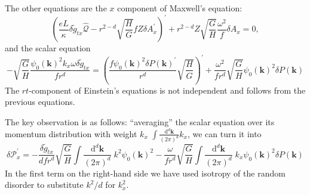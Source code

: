\documentclass[10pt, oneside]{book}
\begin{document}
\begin{doublespace}
The other equations are the $x$ component of
Maxwell's equation: 
\begin{equation}
\left(\frac{eL}{\kappa} \delta \tilde{g}_{tx} \hat{\mathcal{Q}} - r^{2-d}\sqrt{\frac{H}{G}}fZ\delta A_x^\prime \right)^\prime + r^{2-d}Z\sqrt{\frac{G}{H}} \frac{\omega^2}{f} \delta A_x= 0, \label{eq:7}
\end{equation}
and the scalar equation 
\begin{equation}
-\sqrt{\frac{G}{H}}\frac{\psi_0(\mathbf{k})^2 k_x \omega \delta \tilde{g}_{tx}}{fr^d}
= \left(\frac{f\psi_0(\mathbf{k})^2 \delta P(\mathbf{k})^\prime}{r^d}\sqrt{\frac{H}{G}}\right)^\prime+ \frac{\omega^2}{f r^d}\sqrt{\frac{G}{H}} \psi_0(\mathbf{k})^2 \delta P(\mathbf{k})    \label{scalareq2}
\end{equation}
The $rt$-component of Einstein's equations is not independent and follows from the previous equations.

The key observation is as follows: ``averaging'' the scalar equation over its momentum distribution with weight $k_x$ $\int \frac{\mathrm{d}^d \mathbf{k} }{(2\pi)^d} k_x$, we can turn it into 
\begin{equation}
\delta \mathcal{P}_x^\prime = -\frac{ \delta\tilde{g}_{tx}}{dfr^d} \sqrt{\frac{G}{H}} \int \frac{\mathrm{d}^d\mathbf{k}}{(2\pi)^d} \; k^2\psi_0(\mathbf{k})^2  - \frac{\omega}{ f r^d}\sqrt{\frac{G}{H}}\int \frac{\mathrm{d}^d\mathbf{k}}{(2\pi)^d}\; k_x \psi_0(\mathbf{k})^2 \delta P(\mathbf{k})\label{eq:9}
\end{equation}
In the first term on the right-hand side we have used isotropy of the random disorder to substitute $k^2/d$ for $k_x^2$.


\end{doublespace}
\end{document}
